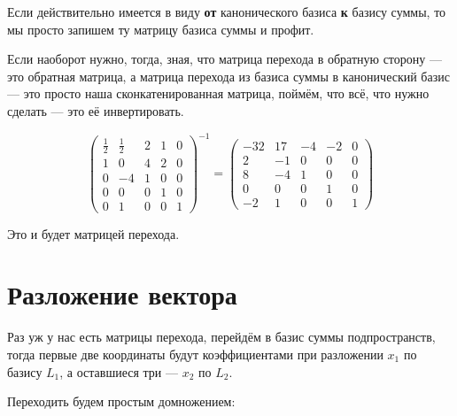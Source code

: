 \documentclass[12pt, a4paper]{article}
\begin{document}
    Если действительно имеется в виду \textbf{от} канонического базиса \textbf{к} базису суммы,
    то мы просто запишем ту матрицу базиса суммы и профит.

    Если наоборот нужно, тогда, зная, что матрица перехода в обратную сторону 
    — это обратная матрица, а матрица перехода из базиса суммы 
    в канонический базис — это просто наша сконкатенированная матрица,
    поймём, что всё, что нужно сделать — это её инвертировать.

    \begin{equation}
        \left(\begin{matrix}
            \frac{1}{2} & \frac{1}{2} & 2 & 1 & 0 \\
            1 & 0 & 4 & 2 & 0 \\
            0 & -4 & 1 & 0 & 0 \\
            0 & 0 & 0 & 1 & 0 \\
            0 & 1 & 0 & 0 & 1
        \end{matrix}\right)^{-1} = \left(\begin{matrix}
            -32 & 17 & -4 & -2 & 0 \\
            2 & -1 & 0 & 0 & 0 \\
            8 & -4 & 1 & 0 & 0 \\
            0 & 0 & 0 & 1 & 0 \\
            -2 & 1 & 0 & 0 & 1
        \end{matrix}\right)
    \end{equation}

    Это и будет матрицей перехода.

    
    \section{Разложение вектора}

    Раз уж у нас есть матрицы перехода, перейдём в базис суммы подпространств, 
    тогда первые две координаты будут коэффициентами при разложении $x_1$ 
    по базису $L_1$, а оставшиеся три — $x_2$ по $L_2$.

    Переходить будем простым домножением:
\end{document}
